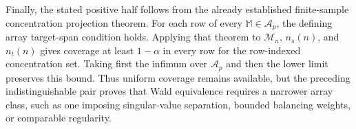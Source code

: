 Finally, the stated positive half follows from the already established finite-sample concentration projection theorem.  For each row of every \(\mathbb M\in\mathcal A_p\), the defining array target-span condition holds.  Applying that theorem to \(\mathcal M_n\), \(n_s(n)\), and \(n_t(n)\) gives coverage at least \(1-\alpha\) in every row for the row-indexed concentration set.  Taking first the infimum over \(\mathcal A_p\) and then the lower limit preserves this bound.  Thus uniform coverage remains available, but the preceding indistinguishable pair proves that Wald equivalence requires a narrower array class, such as one imposing singular-value separation, bounded balancing weights, or comparable regularity.